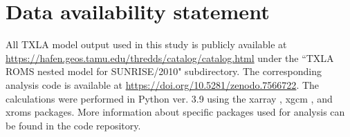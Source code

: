 \section{Data availability statement} 
All TXLA model output used in this study is publicly available at \url{https://hafen.geos.tamu.edu/thredds/catalog/catalog.html} under the ``TXLA ROMS nested model for SUNRISE/2010" subdirectory. The corresponding analysis code is available at \url{https://doi.org/10.5281/zenodo.7566722}. The calculations were performed in Python ver. 3.9 using the xarray \citep{hoyer_stephan_2021_5771208}, xgcm \citep{abernathey_ryan_p_2022_6643579}, and xroms \citep{xroms} packages. More information about specific packages used for analysis can be found in the code repository. 

% 
% 
